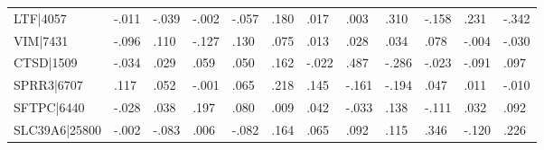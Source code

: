 \begin{table}[h]
\begin{tabular}{llllllllllll}
LTF|4057                        & -.011                            & -.039                            & -.002                            & -.057                            & .180                             & .017                             & .003                             & .310                             & -.158                            & .231                              & -.342                             \\
VIM|7431                        & -.096                            & .110                             & -.127                            & .130                             & .075                             & .013                             & .028                             & .034                             & .078                             & -.004                             & -.030                             \\
CTSD|1509                       & -.034                            & .029                             & .059                             & .050                             & .162                             & -.022                            & .487                             & -.286                            & -.023                            & -.091                             & .097                              \\
SPRR3|6707                      & .117                             & .052                             & -.001                            & .065                             & .218                             & .145                             & -.161                            & -.194                            & .047                             & .011                              & -.010                             \\
SFTPC|6440                      & -.028                            & .038                             & .197                             & .080                             & .009                             & .042                             & -.033                            & .138                             & -.111                            & .032                              & .092                              \\
SLC39A6|25800                   & -.002                            & -.083                            & .006                             & -.082                            & .164                             & .065                             & .092                             & .115                             & .346                             & -.120                             & .226                              \\

\end{tabular}
\end{table}
